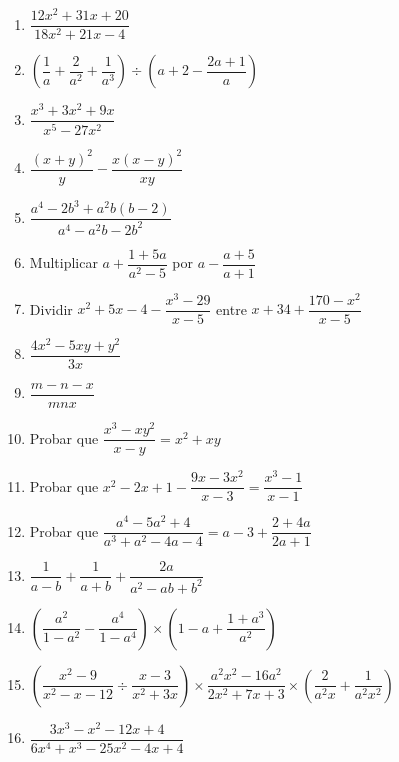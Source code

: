 \documentclass{article}
\begin{document}
\begin{enumerate}[label=\bfseries\small 140.\arabic*, itemsep=4cm]
\large


\item $\dfrac{12x^2 + 31x + 20}{18x^2 + 21x - 4}$

\item $\left( \dfrac{1}{a} + \dfrac{2}{a^2} + \dfrac{1}{a^3} \right) \div \left( a + 2 - \dfrac{2a + 1}{a} \right)$

\item $\dfrac{x^3 + 3x^2 + 9x}{x^5 - 27x^2}$

\item $\dfrac{(x+y)^2}{y} - \dfrac{x(x-y)^2}{xy}$

\item $\dfrac{a^4 - 2b^3 + a^2b(b-2)}{a^4 - a^2b - 2b^2}$

\item Multiplicar $a + \dfrac{1+5a}{a^2-5}$ por $a - \dfrac{a+5}{a+1}$

\item Dividir $x^2 + 5x - 4 - \dfrac{x^3 - 29}{x - 5}$ entre $x + 34 + \dfrac{170 - x^2}{x - 5}$

\item $\dfrac{4x^2 - 5xy + y^2}{3x}$

\item $\dfrac{m - n - x}{mnx}$

\item Probar que $\dfrac{x^3 - xy^2}{x - y} = x^2 + xy$

\item Probar que $x^2 - 2x + 1 - \dfrac{9x - 3x^2}{x - 3} = \dfrac{x^3 - 1}{x - 1}$

\item Probar que $\dfrac{a^4 - 5a^2 + 4}{a^3 + a^2 - 4a - 4} = a - 3 + \dfrac{2 + 4a}{2a + 1}$

\item $\dfrac{1}{a-b} + \dfrac{1}{a+b} + \dfrac{2a}{a^2-ab+b^2}$

\item $\left( \dfrac{a^2}{1-a^2} - \dfrac{a^4}{1-a^4} \right) \times \left( 1-a + \dfrac{1+a^3}{a^2} \right)$

\item $\left( \dfrac{x^2-9}{x^2-x-12} \div \dfrac{x-3}{x^2+3x} \right) \times \dfrac{a^2x^2-16a^2}{2x^2+7x+3} \times \left( \dfrac{2}{a^2x} + \dfrac{1}{a^2x^2} \right)$

\item $\dfrac{3x^3-x^2-12x+4}{6x^4+x^3-25x^2-4x+4}$


\end{enumerate}
\end{document}
